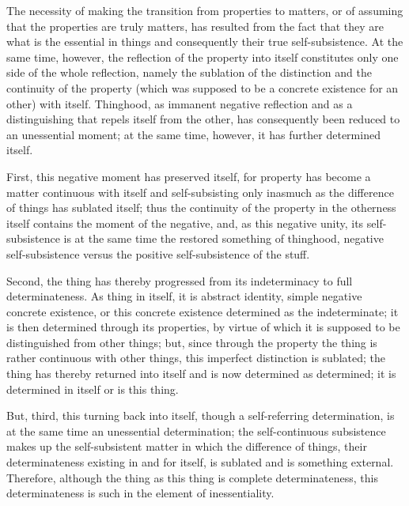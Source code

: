 The necessity of making the transition from properties to matters, or of
assuming that the properties are truly matters, has resulted from the fact
that they are what is the essential in things and consequently their true
self-subsistence.
At the same time, however, the reflection of the property
into itself constitutes only one side of the whole reflection,
namely the sublation of the distinction and the continuity of the property
(which was supposed to be a concrete existence for an other)
with itself.
Thinghood, as immanent negative reflection and as a distinguishing that repels itself
from the other, has consequently been reduced to an unessential moment;
at the same time, however, it has further determined itself.

First, this negative moment has preserved itself,
for property has become a matter continuous with itself
and self-subsisting only inasmuch as the difference
of things has sublated itself;
thus the continuity of the property in the otherness
itself contains the moment of the negative,
and, as this negative unity, its self-subsistence is at the same time
the restored something of thinghood, negative self-subsistence
versus the positive self-subsistence of the stuff.

Second, the thing has thereby progressed
from its indeterminacy to full determinateness.
As thing in itself, it is abstract identity,
simple negative concrete existence,
or this concrete existence determined as the indeterminate;
it is then determined through its properties,
by virtue of which it is supposed to be distinguished from other things;
but, since through the property the thing is
rather continuous with other things,
this imperfect distinction is sublated;
the thing has thereby returned into itself
and is now determined as determined;
it is determined in itself or is this thing.

But, third, this turning back into itself,
though a self-referring determination,
is at the same time an unessential determination;
the self-continuous subsistence makes up
the self-subsistent matter in which the difference of things,
their determinateness existing in and for itself,
is sublated and is something external.
Therefore, although the thing as this thing
is complete determinateness, this determinateness is such
in the element of inessentiality.

